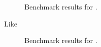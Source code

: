 \begin{figure}[!htb]
	\centering
	
	\caption{Benchmark results for .}
\end{figure}

Like 

\begin{figure}[!htb]
	\centering
	
	\caption{Benchmark results for .}
\end{figure}

